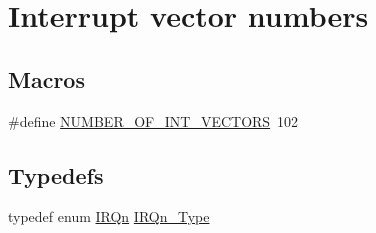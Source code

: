 \hypertarget{group___interrupt__vector__numbers}{}\section{Interrupt vector numbers}
\label{group___interrupt__vector__numbers}
\subsection*{Macros}
\begin{DoxyCompactItemize}
\item 
\#define \mbox{\hyperlink{group___interrupt__vector__numbers_gafe46d81f4fa2c4f6ed1361f24f046fa8}{N\+U\+M\+B\+E\+R\+\_\+\+O\+F\+\_\+\+I\+N\+T\+\_\+\+V\+E\+C\+T\+O\+RS}}~102
\end{DoxyCompactItemize}
\subsection*{Typedefs}
\begin{DoxyCompactItemize}
\item 
typedef enum \mbox{\hyperlink{group___interrupt__vector__numbers_ga666eb0caeb12ec0e281415592ae89083}{I\+R\+Qn}} \mbox{\hyperlink{group___interrupt__vector__numbers_gac3af4a32370fb28c4ade8bf2add80251}{I\+R\+Qn\+\_\+\+Type}}
\end{DoxyCompactItemize}
